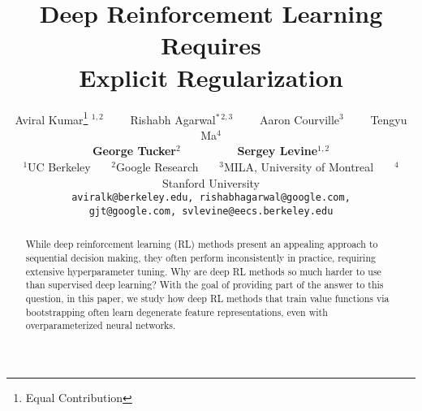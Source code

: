 \documentclass{article}
\title{Deep Reinforcement Learning Requires\\ Explicit Regularization}
\author{%
  Aviral Kumar\thanks{Equal Contribution}$^{\ \ 1,2}$~~~~ Rishabh Agarwal$^{*\, 2,3}$~~~~ Aaron Courville$^{3}$~~~~ Tengyu Ma$^{4}$\\ \textbf{George Tucker$^{2}$~~~~~~~~ Sergey Levine$^{1,2}$} \vspace{0.05in} \\ $^1$UC Berkeley~~~ $^2$Google Research~~~ $^3$MILA, University of Montreal~~~ $^4$Stanford University \\
  \texttt{aviralk@berkeley.edu, rishabhagarwal@google.com,}\\ \texttt{gjt@google.com, svlevine@eecs.berkeley.edu}
}
\begin{document}

\maketitle


\begin{abstract}
While deep reinforcement learning (RL) methods present an appealing approach to sequential decision making, they often perform inconsistently in practice, requiring extensive hyperparameter tuning. Why are deep RL methods so much harder to use than supervised deep learning?
With the goal of providing part of the answer to this question, in this paper, we study how deep RL methods that train value functions via bootstrapping often learn degenerate feature representations, even with overparameterized neural networks.

\end{abstract}
\end{document}
